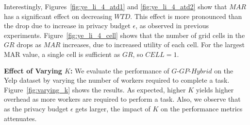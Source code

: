 \documentclass{USC-Thesis}
\numberwithin{equation}{chapter}
\begin{document}
\begin{comment}
\begin{figure*}[tbh]
	\begin{minipage}[b]{0.195\linewidth}
	\centering
		\texttt{[image: exps/ye\_li\_5\_anw]}
		\subcaption{$\mathit{ANW}$, Ye.-Linear}
		\label{fig:ye_li_5_anw}
	\end{minipage}
	\begin{minipage}[b]{0.195\linewidth}
	\centering
		\texttt{[image: exps/ye\_li\_5\_hop]}
		\subcaption{$\mathit{HOP}$, Ye.-Linear}
		\label{fig:ye_li_5_hop}
	\end{minipage}
	\begin{minipage}[b]{0.195\linewidth}
	\centering
		\subcaption{$\mathit{WTD_{NN}}$, Ye.-Linear}
		\label{fig:ye_li_5_atd1}
	\end{minipage}	
	\begin{minipage}[b]{0.195\linewidth}
	\centering
		\texttt{[image: exps/ye\_li\_5\_atd2]}
		\subcaption{$\mathit{WTD_{FC}}$, Ye.-Linear}
		\label{fig:ye_li_5_atd2}
	\end{minipage}
	\begin{minipage}[b]{0.195\linewidth}
		\centering
		\texttt{[image: exps/ye\_li\_5\_cell]}
		\subcaption{$\mathit{CELL}$, Ye.-Linear}
		\label{fig:ye_li_5_cell}
	\end{minipage}
	\caption{Performance of geocast algorithm ($G$-$\mathit{GP}$-$\mathit{Hybrid}$) when varying $\mathit{EU}$ (Ye.-Linear).}
\label{fig:varying_eu}
\end{figure*}
\end{comment}

Interestingly, Figures~\ref{fig:ye_li_4_atd1} and \ref{fig:ye_li_4_atd2} show that $MAR$ has a significant effect on decreasing $\mathit{WTD}$. This effect is more pronounced than the drop due to increase in privacy budget $\epsilon$, as observed in previous experiments. Figure~\ref{fig:ye_li_4_cell} shows that the number of grid cells in the $\mathit{GR}$ drops as $\mathit{MAR}$ increases, due to increased utility of each cell. For the largest MAR value, a single cell is sufficient as $\mathit{GR}$, so $\mathit{CELL=1}$.


\textbf{Effect of Varying $K$:}
We evaluate the performance of $G$-$\mathit{GP}$-$\mathit{Hybrid}$ on the Yelp dataset by varying the number of workers required to complete a task. Figure~\ref{fig:varying_k} shows the results. As expected, higher $K$ yields higher overhead as more workers are required to perform a task. Also, we observe that as the privacy budget $\epsilon$ gets larger, the impact of $K$ on the performance metrics attenuates.
\end{document}
